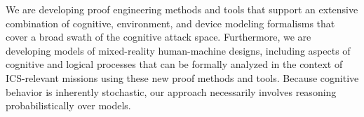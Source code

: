 We are developing proof engineering methods and tools that support an extensive combination of cognitive, environment, and device modeling formalisms that cover a broad swath of the cognitive attack space. Furthermore, we are developing models of mixed-reality human-machine designs, including aspects of cognitive and logical processes that can be formally analyzed in the context of ICS-relevant missions using these new proof methods and tools.  Because cognitive behavior is inherently stochastic, our approach necessarily involves reasoning probabilistically over models. 